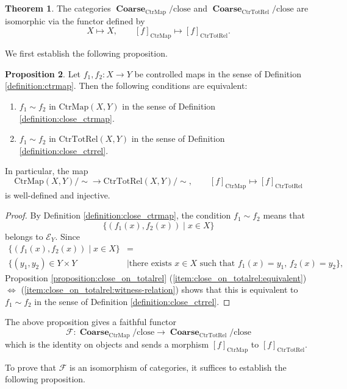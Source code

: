\documentclass[12pt, a4paper]{amsart}
\theoremstyle{definition}
\newtheorem{theorem}{Theorem}[section]
\newtheorem{proposition}[theorem]{Proposition}
\newcommand{\Coarse}{\mathop{\mathbf{Coarse}}\nolimits}
\newcommand{\CtrMap}{\mathrm{CtrMap}}
\newcommand{\CtrTotRel}{\mathrm{CtrTotRel}}
\newcommand{\close}{\mathrm{close}}
\begin{document}
\begin{theorem}\label{theorem:CtrMapClo_isom_CtrTotRelClo}
The categories
$\Coarse_{\CtrMap}/{\close}$
and
$\Coarse_{\CtrTotRel}/{\close}$
are isomorphic via the functor defined by
\[
X\mapsto X,
\qquad
[f]_{\CtrMap}\mapsto [f]_{\CtrTotRel}.
\]
\end{theorem}

We first establish the following proposition.

\begin{proposition}
Let $f_1,f_2:X\to Y$ be controlled maps in the sense of
Definition \ref{definition:ctrmap}.
Then the following conditions are equivalent:
\begin{enumerate}
\item
$f_1\sim f_2$ in $\CtrMap(X,Y)$ in the sense of
Definition \ref{definition:close_ctrmap}.

\item
$f_1\sim f_2$ in $\CtrTotRel(X,Y)$ in the sense of
Definition \ref{definition:close_ctrrel}.
\end{enumerate}
In particular, the map
\[
\CtrMap(X,Y)/{\sim}
\longrightarrow
\CtrTotRel(X,Y)/{\sim},
\qquad
[f]_{\CtrMap}
\longmapsto
[f]_{\CtrTotRel}
\]
is well-defined and injective.
\end{proposition}

\begin{proof}
By Definition \ref{definition:close_ctrmap},
the condition $f_1\sim f_2$ means that
\[
\{(f_1(x),f_2(x))\mid x\in X\}
\]
belongs to $\mathcal{E}_Y$.
Since
\begin{align*}
\{(f_1(x),f_2(x))\mid x\in X\}
&= \\
\{
(y_1,y_2)\in Y\times Y
&\mid
\text{there exists }x\in X
\text{ such that }
f_1(x)=y_1,\,
f_2(x)=y_2
\},
\end{align*}
Proposition
\ref{proposition:close_on_totalrel}
(\ref{item:close_on_totalrel:equivalent})
$\Leftrightarrow$
(\ref{item:close_on_totalrel:witness-relation})
shows that this is equivalent to
$f_1\sim f_2$
in the sense of Definition
\ref{definition:close_ctrrel}.
\end{proof}

The above proposition gives a faithful functor
\[
\mathcal{F}
:
\Coarse_{\CtrMap}/{\close}
\longrightarrow
\Coarse_{\CtrTotRel}/{\close}
\]
which is the identity on objects and sends a morphism
$[f]_{\CtrMap}$
to
$[f]_{\CtrTotRel}$.

To prove that $\mathcal{F}$ is an isomorphism of categories, it suffices to
establish the following proposition.
\end{document}
